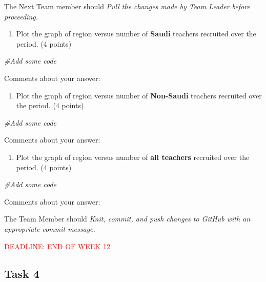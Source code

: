 \documentclass[
]{article}
\newenvironment{Shaded}{\begin{snugshade}}{\end{snugshade}}
\newcommand{\CommentTok}[1]{\textcolor[rgb]{0.56,0.35,0.01}{\textit{#1}}}
\providecommand{\tightlist}{%
  \setlength{\itemsep}{0pt}\setlength{\parskip}{0pt}}
\begin{document}
The Next Team member should \emph{Pull the changes made by Team Leader
before proceeding.}

\begin{enumerate}
\def\labelenumi{(\alph{enumi})}
\setcounter{enumi}{2}
\tightlist
\item
  Plot the graph of region versus number of \textbf{Saudi} teachers
  recruited over the period. (4 points)
\end{enumerate}

\begin{Shaded}
\begin{Highlighting}[]
\CommentTok{\#Add some code}
\end{Highlighting}
\end{Shaded}

Comments about your answer:

\begin{enumerate}
\def\labelenumi{(\alph{enumi})}
\setcounter{enumi}{3}
\tightlist
\item
  Plot the graph of region versus number of \textbf{Non-Saudi} teachers
  recruited over the period. (4 points)
\end{enumerate}

\begin{Shaded}
\begin{Highlighting}[]
\CommentTok{\#Add some code}
\end{Highlighting}
\end{Shaded}

Comments about your answer:

\begin{enumerate}
\def\labelenumi{(\alph{enumi})}
\setcounter{enumi}{4}
\tightlist
\item
  Plot the graph of region versus number of \textbf{all teachers}
  recruited over the period. (4 points)
\end{enumerate}

\begin{Shaded}
\begin{Highlighting}[]
\CommentTok{\#Add some code}
\end{Highlighting}
\end{Shaded}

Comments about your answer:

The Team Member should \emph{Knit, commit, and push changes to GitHub
with an appropriate commit message.}

\textcolor{red}{DEADLINE: END OF WEEK 12}

\hypertarget{task-4}{%
\subsection{Task 4}\label{task-4}}
\end{document}
